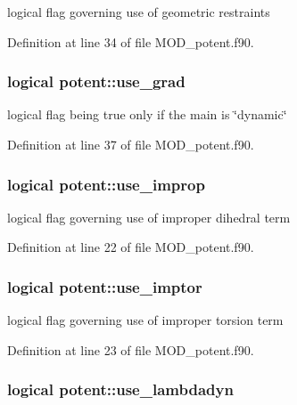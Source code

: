 logical flag governing use of geometric restraints 



Definition at line 34 of file M\-O\-D\-\_\-potent.\-f90.

\hypertarget{classpotent_a46397d2d8b4246feb7b51ccfc311fc83}{
\subsubsection[{use\-\_\-grad}]{\setlength{\rightskip}{0pt plus 5cm}logical potent\-::use\-\_\-grad}}\label{classpotent_a46397d2d8b4246feb7b51ccfc311fc83}


logical flag being true only if the main is \char`\"{}dynamic\char`\"{} 



Definition at line 37 of file M\-O\-D\-\_\-potent.\-f90.

\hypertarget{classpotent_affab2bb5c07b079cb2f5b167baa6a994}{
\subsubsection[{use\-\_\-improp}]{\setlength{\rightskip}{0pt plus 5cm}logical potent\-::use\-\_\-improp}}\label{classpotent_affab2bb5c07b079cb2f5b167baa6a994}


logical flag governing use of improper dihedral term 



Definition at line 22 of file M\-O\-D\-\_\-potent.\-f90.

\hypertarget{classpotent_a66a1f57b71ad896ee516a52931946dd5}{
\subsubsection[{use\-\_\-imptor}]{\setlength{\rightskip}{0pt plus 5cm}logical potent\-::use\-\_\-imptor}}\label{classpotent_a66a1f57b71ad896ee516a52931946dd5}


logical flag governing use of improper torsion term 



Definition at line 23 of file M\-O\-D\-\_\-potent.\-f90.

\hypertarget{classpotent_a208bb4052d3f534fae41d09bf30f9cca}{
\subsubsection[{use\-\_\-lambdadyn}]{\setlength{\rightskip}{0pt plus 5cm}logical potent\-::use\-\_\-lambdadyn}}\label{classpotent_a208bb4052d3f534fae41d09bf30f9cca}



